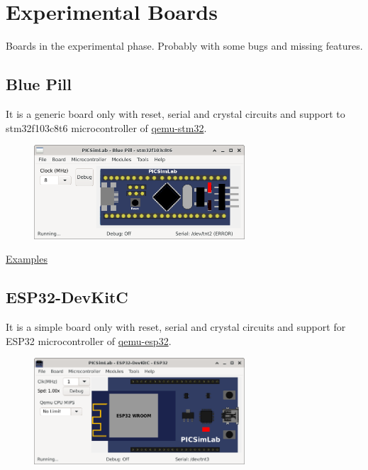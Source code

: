 \chapter{Experimental Boards} \hypertarget{def:eboards}{}

Boards in the experimental phase. Probably with some bugs and missing features. 

\section{Blue Pill}

It is a generic board only with reset, serial and crystal circuits and support to stm32f103c8t6 microcontroller of 
\href{https://beckus.github.io/qemu_stm32/}{qemu-stm32}.

\begin{figure}[H]
\center
\includegraphics[width=0.7\textwidth]{img/Blue_Pill.png} 
\end{figure} 

\href{https://lcgamboa.github.io/picsimlab_examples/board_Blue_Pill.html}{Examples}


\section{ESP32-DevKitC}

It is a simple board only with reset, serial and crystal circuits and support 
for ESP32 microcontroller of \href{https://github.com/a159x36/qemu}{qemu-esp32}.

\begin{figure}[H]
\center
\includegraphics[width=0.7\textwidth]{img/DevKitC.png} 
\end{figure} 


